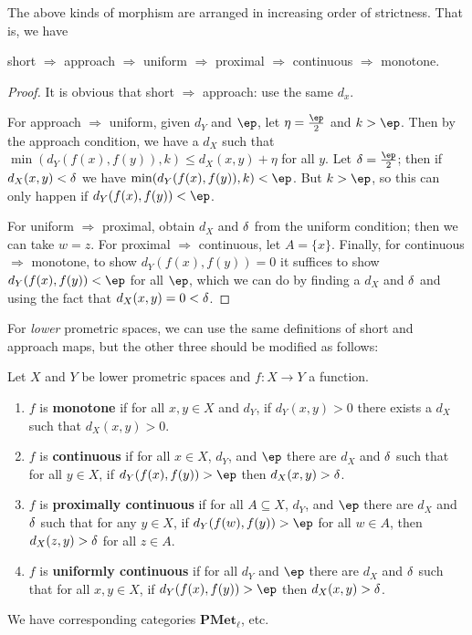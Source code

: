\documentclass{article}
\let\implies\Rightarrow
\def\hfep{\frac{\ep}{2}}
\def\singleton#1{\{#1\}}
\def\PMet{\mathbf{PMet}}
\begin{document}
\begin{thm}
  The above kinds of morphism are arranged in increasing order of strictness.
  That is, we have
  \begin{center}
    short $\implies$ approach $\implies$ uniform $\implies$ proximal $\implies$ continuous $\implies$ monotone.
  \end{center}
\end{thm}
\begin{proof}
  It is obvious that short $\implies$ approach: use the same $d_x$.

  For approach $\implies$ uniform, given $d_Y$ and $\ep$, let $\eta = \hfep$ and $k>\ep$.
  Then by the approach condition, we have a $d_X$ such that $\min(d_Y(f(x),f(y)),k) \le d_X(x,y) +\eta$ for all $y$.
  Let $\de=\hfep$; then if $d_X(x,y)<\delta$ we have $\min(d_Y(f(x),f(y)),k) < \ep$.
  But $k>\ep$, so this can only happen if $d_Y(f(x),f(y))<\ep$.

  For uniform $\implies$ proximal, obtain $d_X$ and $\delta$ from the uniform condition; then we can take $w=z$.
  For proximal $\implies$ continuous, let $A = \singleton{x}$.
  Finally, for continuous $\implies$ monotone, to show $d_Y(f(x),f(y))=0$ it suffices to show $d_Y(f(x),f(y))<\ep$ for all $\ep$, which we can do by finding a $d_X$ and $\delta$ and using the fact that $d_X(x,y)=0 <\delta$.
\end{proof}

For \emph{lower} prometric spaces, we can use the same definitions of short and approach maps, but the other three should be modified as follows:

\begin{defn}
  Let $X$ and $Y$ be lower prometric spaces and $f:X\to Y$ a function.
  \begin{enumerate}
  \item $f$ is \textbf{monotone} if for all $x,y\in X$ and $d_Y$, if $d_Y(x,y)>0$ there exists a $d_X$ such that $d_X(x,y)>0$.
  \item $f$ is \textbf{continuous} if for all $x\in X$, $d_Y$, and $\ep$ there are $d_X$ and $\delta$ such that for all $y\in X$, if $d_Y(f(x),f(y))>\ep$ then $d_X(x,y)>\delta$.
  \item $f$ is \textbf{proximally continuous} if for all $A\subseteq X$, $d_Y$, and $\ep$ there are $d_X$ and $\delta$ such that for any $y\in X$, if $d_Y(f(w),f(y))>\ep$ for all $w\in A$, then $d_X(z,y)>\delta$ for all $z\in A$.
  \item $f$ is \textbf{uniformly continuous} if for all $d_Y$ and $\ep$ there are $d_X$ and $\delta$ such that for all $x,y\in X$, if $d_Y(f(x),f(y))>\ep$ then $d_X(x,y)>\delta$.
  \end{enumerate}
  We have corresponding categories $\PMet_\ell$, etc.
\end{defn}
\end{document}
